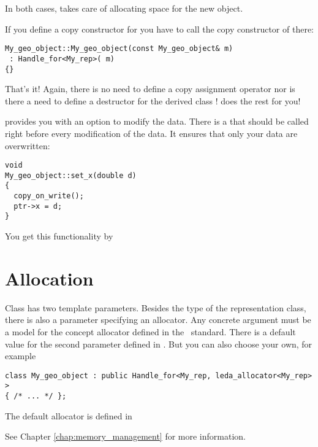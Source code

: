 In both cases,  takes care of allocating space for
the new object. 

If you define a copy constructor for  
you have to call the copy constructor of  there:

\begin{verbatim}
My_geo_object::My_geo_object(const My_geo_object& m)
 : Handle_for<My_rep>( m) 
{}
\end{verbatim}

That's it! Again, there is no need to define a copy assignment operator 
nor is there a need to define a destructor for the derived class 
!   does the rest for you!

 provides you with an option to modify the data. There is
a  
that should be called right before every modification of the data. 
It ensures that only your data are overwritten: 

\begin{verbatim}
void 
My_geo_object::set_x(double d)
{
  copy_on_write();
  ptr->x = d;
}
\end{verbatim}
You get this functionality by


\section{Allocation}
Class  has two template parameters. Besides the
type of the representation class, there is also a parameter specifying an
allocator.
Any concrete argument must be a model for the concept allocator
defined in the \CC\ standard. There is a default value for the second
parameter defined in . But you can also choose your
own, for example

\begin{verbatim}
class My_geo_object : public Handle_for<My_rep, leda_allocator<My_rep> > 
{ /* ... */ };
\end{verbatim}

The default allocator is defined in


See Chapter \ref{chap:memory_management} for more information.

